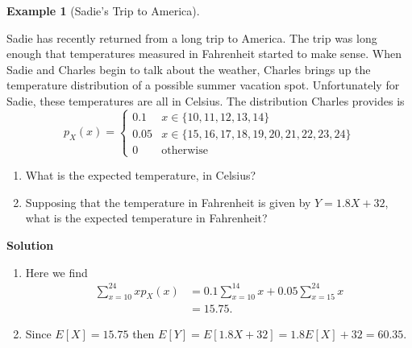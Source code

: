 \documentclass[
  letterpaper,
  DIV=11,
  numbers=noendperiod]{scrreprt}
\providecommand{\tightlist}{%
  \setlength{\itemsep}{0pt}\setlength{\parskip}{0pt}}\usepackage{longtable,booktabs,array}
\theoremstyle{definition}
\theoremstyle{definition}
\newtheorem{example}{Example}[chapter]
\theoremstyle{definition}
\theoremstyle{remark}
\begin{document}
\begin{example}[Sadie's Trip to
America]\protect\hypertarget{exm-temperature-conversion}{}\label{exm-temperature-conversion}

Sadie has recently returned from a long trip to America. The trip was
long enough that temperatures measured in Fahrenheit started to make
sense. When Sadie and Charles begin to talk about the weather, Charles
brings up the temperature distribution of a possible summer vacation
spot. Unfortunately for Sadie, these temperatures are all in Celsius.
The distribution Charles provides is \[p_X(x) = \begin{cases}
    0.1 & x \in \{10, 11, 12, 13, 14\} \\
    0.05 & x \in \{15, 16, 17, 18, 19, 20, 21, 22, 23, 24\} \\
    0 & \text{otherwise}
\end{cases}\]

\begin{enumerate}
\def\labelenumi{\alph{enumi}.}
\tightlist
\item
  What is the expected temperature, in Celsius?
\item
  Supposing that the temperature in Fahrenheit is given by
  \(Y = 1.8X + 32\), what is the expected temperature in Fahrenheit?
\end{enumerate}

\begin{tcolorbox}[enhanced jigsaw, colback=white, colframe=quarto-callout-color-frame, arc=.35mm, leftrule=.75mm, rightrule=.15mm, opacityback=0, breakable, bottomrule=.15mm, left=2mm, toprule=.15mm]

\vspace{-3mm}\textbf{Solution}\vspace{3mm}

\begin{enumerate}
\def\labelenumi{\alph{enumi}.}
\item
  Here we find \begin{align*}
   \sum_{x=10}^{24} xp_X(x) &= 0.1\sum_{x=10}^{14}x + 0.05\sum_{x=15}^{24}x \\
   &= 15.75.
  \end{align*}
\item
  Since \(E[X] = 15.75\) then
  \(E[Y] = E[1.8X + 32] = 1.8E[X] + 32 = 60.35\).
\end{enumerate}

\end{tcolorbox}

\end{example}
\end{document}
